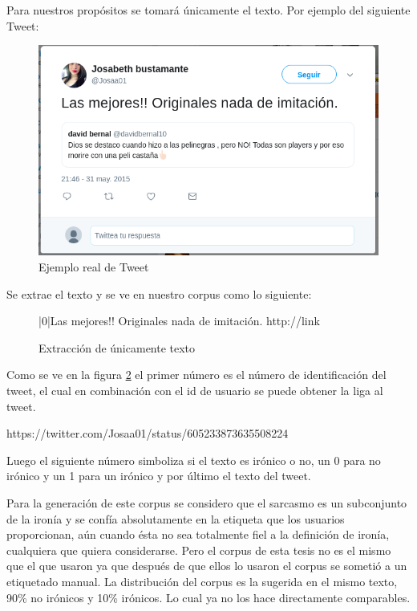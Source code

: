 \par Para nuestros propósitos se tomará únicamente el texto. Por ejemplo del siguiente Tweet:
\begin{figure}[h!]
	\centering
	\includegraphics[width=\linewidth]{imagenes/ejemploTweet.png}
	\caption{Ejemplo real de Tweet}
	\label{fig:ejTweet}
\end{figure}

\par Se extrae el texto y se ve en nuestro corpus como lo siguiente:

\begin{figure}[!ht]
	|0|Las mejores!! Originales nada de imitación. http://link
	\caption{Extracción de únicamente texto}
	\label{fig:ejTweetText}
\end{figure}

\par Como se ve en la figura \ref{fig:ejTweetText} el primer número es el número de identificación del tweet, el cual en combinación con el id de usuario se puede obtener la liga al tweet.

\vspace{5pt}
\begin{center}
	\par https://twitter.com/Josaa01/status/605233873635508224
\end{center}

\vspace{5pt}
\par Luego el siguiente número simboliza si el texto es irónico o no, un 0 para no irónico y un 1 para un irónico y por último el texto del tweet.

\par Para la generación de este corpus se considero que el sarcasmo es un subconjunto de la ironía y se confía absolutamente en la etiqueta que los usuarios proporcionan, aún cuando ésta no sea totalmente fiel a la definición de ironía, cualquiera que quiera considerarse. Pero el corpus de esta tesis no es el mismo que el que usaron \cite{lopez2016character} ya que después de que ellos lo usaron el corpus se sometió a un etiquetado manual. La distribución del corpus es la sugerida en el mismo texto, 90\% no irónicos y 10\% irónicos. Lo cual ya no los hace directamente comparables.

